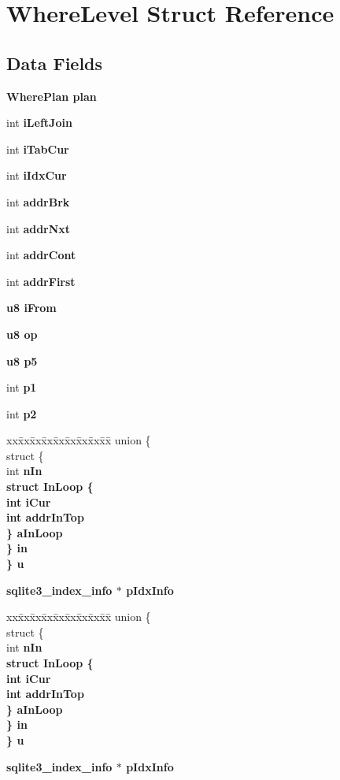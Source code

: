 \section{Where\-Level Struct Reference}
\label{structWhereLevel}
\subsection*{Data Fields}
\begin{CompactItemize}
\item 
\bf{Where\-Plan} \bf{plan}
\item 
int \bf{i\-Left\-Join}
\item 
int \bf{i\-Tab\-Cur}
\item 
int \bf{i\-Idx\-Cur}
\item 
int \bf{addr\-Brk}
\item 
int \bf{addr\-Nxt}
\item 
int \bf{addr\-Cont}
\item 
int \bf{addr\-First}
\item 
\bf{u8} \bf{i\-From}
\item 
\bf{u8} \bf{op}
\item 
\bf{u8} \bf{p5}
\item 
int \bf{p1}
\item 
int \bf{p2}
\item 
\begin{tabbing}
xx\=xx\=xx\=xx\=xx\=xx\=xx\=xx\=xx\=\kill
union \{\\
\>struct \{\\
\>\>int \bf{nIn}\\
\>\>struct \textbf{InLoop} \{\\
\>\>\>int \bf{iCur}\\
\>\>\>int \bf{addrInTop}\\
\>\>\} \bf{aInLoop}\\
\>\} \bf{in}\\
\} \bf{u}\\

\end{tabbing}\item 
\bf{sqlite3\_\-index\_\-info} $\ast$ \bf{p\-Idx\-Info}
\item 
\begin{tabbing}
xx\=xx\=xx\=xx\=xx\=xx\=xx\=xx\=xx\=\kill
union \{\\
\>struct \{\\
\>\>int \bf{nIn}\\
\>\>struct \textbf{InLoop} \{\\
\>\>\>int \bf{iCur}\\
\>\>\>int \bf{addrInTop}\\
\>\>\} \bf{aInLoop}\\
\>\} \bf{in}\\
\} \bf{u}\\

\end{tabbing}\item 
\bf{sqlite3\_\-index\_\-info} $\ast$ \bf{p\-Idx\-Info}
\end{CompactItemize}


